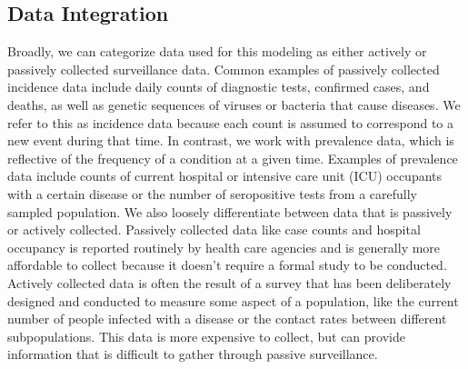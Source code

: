 \subsection{Data Integration}
\label{ch_2:sec:data_integration}
Broadly, we can categorize data used for this modeling as either actively or passively collected surveillance data.
Common examples of passively collected incidence data include daily counts of diagnostic tests, confirmed cases, and deaths, as well as genetic sequences of viruses or bacteria that cause diseases.
We refer to this as incidence data because each count is assumed to correspond to a new event during that time.
In contrast, we work with prevalence data, which is reflective of the frequency of a condition at a given time.
Examples of prevalence data include counts of current hospital or intensive care unit (ICU) occupants with a certain disease or the number of seropositive tests from a carefully sampled population.
We also loosely differentiate between data that is passively or actively collected.
Passively collected data like case counts and hospital occupancy is reported routinely by health care agencies and is generally more affordable to collect because it doesn't require a formal study to be conducted.
Actively collected data is often the result of a survey that has been deliberately designed and conducted to measure some aspect of a population, like the current number of people infected with a disease or the contact rates between different subpopulations.
This data is more expensive to collect, but can provide information that is difficult to gather through passive surveillance.

